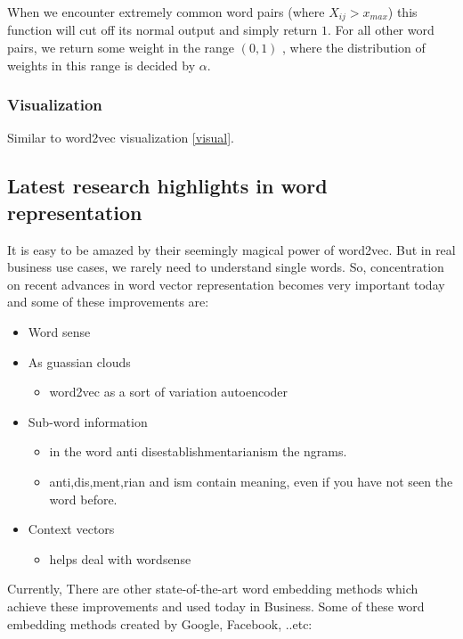 When we encounter extremely common word pairs (where $X_{ij}>{x_{max}}$) this function will cut off its normal output and simply return $1$. For all other word pairs, we return some weight in the range $(0,1)$ , where the distribution of weights in this range is decided by $\alpha$.
\subsubsection{Visualization}
Similar to word2vec visualization \ref{visual}.
\subsection{Latest research highlights in word representation}
It is easy to be amazed by their seemingly magical power of word2vec. But in real business use cases, we rarely need to understand single words. So, concentration on recent advances in word vector representation  becomes very important today and some of these improvements are:
\begin{itemize}
    \item Word sense
    \item As guassian clouds
       \begin{itemize}
              \item word2vec as a sort of variation autoencoder
       \end{itemize}
    \item Sub-word information
        \begin{itemize}
              \item in the word anti disestablishmentarianism the ngrams.
              \item anti,dis,ment,rian and ism contain meaning, even if you have not seen the word before.
       \end{itemize}
    \item Context vectors
       \begin{itemize}
             \item helps deal with wordsense
      \end{itemize}
\end{itemize}
 Currently, There are other state-of-the-art word embedding methods which achieve these improvements and used today in Business. Some of these word embedding methods created by Google, Facebook, ..etc:
